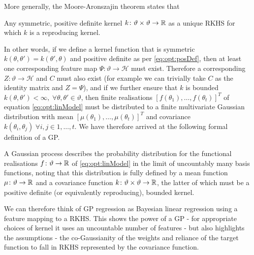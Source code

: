 More generally, the Moore-Aronszajin theorem \cite{aronszajn1950theory} states that
\begin{theorem}
	\label{the:opt:Moore-Aronszajin}
	Any symmetric, positive definite kernel $k \colon \vartheta \times \vartheta \rightarrow \mathbb{R}$ as a unique RKHS for which $k$ is a reproducing kernel.
\end{theorem}
In other words, if we define a kernel function that is symmetric $k\left(\theta,\theta'\right) = k\left(\theta',\theta\right)$ and positive definite as per \eqref{eq:opt:posDef}, then at least one corresponding feature map $\Psi \colon \vartheta \rightarrow \mathcal{H}$ must exist.  Therefore a corresponding $Z \colon \vartheta \rightarrow \mathcal{H}$ and $C$ must also exist (for example we can trivially take $C$ as the identity matrix and $Z = \Psi$), and if we further ensure that $k$ is bounded $k\left(\theta,\theta'\right) < \infty, \; \forall \theta, \theta' \in \vartheta$, then finite realisations  $\left[f\left(\theta_1\right),\dots,f\left(\theta_t\right)\right]^T$ of equation \eqref{eq:opt:linModel} must be distributed to a finite multivariate Gaussian distribution with mean  $\left[\mu\left(\theta_1\right),\dots,\mu\left(\theta_t\right)\right]^T$ and covariance $k\left(\theta_i,\theta_j\right) \; \forall i,j \in {1,\dots,t}$.  We have therefore arrived at the following formal definition of a GP.

\begin{definition}{}
	\label{def:opt:GP}
	A Gaussian process describes the probability distribution for the functional realisations $f \colon \vartheta \rightarrow \mathbb{R}$ of \eqref{eq:opt:linModel} in the limit of uncountably many basis functions, noting that this distribution is fully defined by a mean function $\mu \colon \vartheta \rightarrow \mathbb{R}$ and a covariance function $k\colon \vartheta \times \vartheta \rightarrow \mathbb{R}$, the latter of which must be a positive definite (or equivalently reproducing), bounded kernel.  
\end{definition}{}

We can therefore think of GP regression as Bayesian linear regression using
a feature mapping to a RKHS.  This shows the power of a GP - for appropriate
choices of kernel it uses an uncountable number of features - but also highlights
the assumptions - the co-Gaussianity of the weights and reliance of the target
function to fall in RKHS represented by the covariance function.